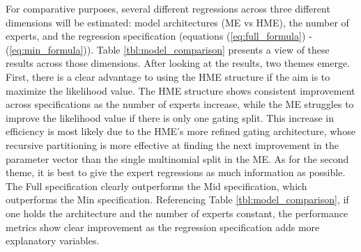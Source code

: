 \documentclass[12pt]{article}
\theoremstyle{definition}
\begin{document}
For comparative purposes, several different regressions across three
different dimensions will be estimated: model architectures (ME vs HME), the number of experts,
and the regression specification (equations (\ref{eq:full_formula}) -
(\ref{eq:min_formula})). Table \ref{tbl:model_comparison} presents a view of these
results across those dimensions. After looking at the results,
two themes emerge. First, there is a clear advantage to using the HME structure
if the aim is to maximize the likelihood value. The HME structure shows consistent
improvement across specifications as the number of experts increase, while the ME
struggles to improve the likelihood value if there is only one gating split.
This increase in efficiency is most likely due
to the HME's more refined gating architecture, whose recursive partitioning is more
effective at finding the next improvement in the parameter vector than the single
multinomial split in the ME. As for the second theme, it is best to give the expert
regressions as much information as possible. The Full specification clearly outperforms
the Mid specification, which outperforms the Min specification. Referencing Table
\ref{tbl:model_comparison}, if one holds the architecture and the number of experts
constant, the performance metrics show clear improvement as the regression specification
adds more explanatory variables.
\end{document}
